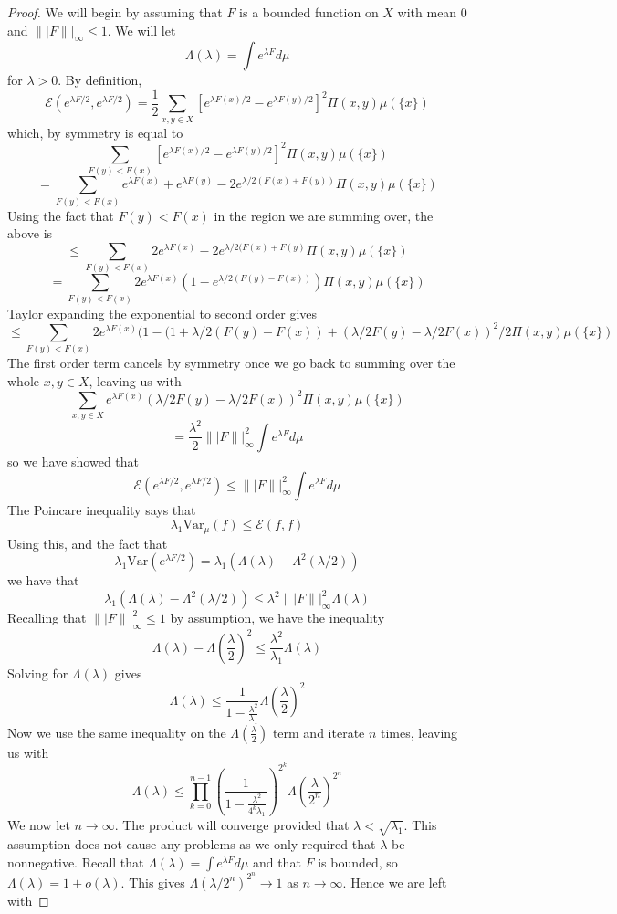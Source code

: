 \documentclass[12pt]{report}
\theoremstyle{definition}
\begin{document}
\begin{proof}
We will begin by assuming that $F$ is a bounded function on $X$ with mean $0$ and $\||F\||_{\infty}\leq 1$.  We will let 
$$
\Lambda(\lambda)=\int e^{\lambda F}d\mu
$$
for $\lambda>0$.  By definition, 
$$
\mathcal{E}( e^{\lambda F/2},  e^{\lambda F/2})=\frac{1}{2}\sum_{x,y\in X}[ e^{\lambda F(x)/2}-e^{\lambda F(y)/2}]^2\Pi(x,y)\mu(\{x\})
$$
which, by symmetry is equal to 
$$
\sum_{F(y)<F(x)}[ e^{\lambda F(x)/2}-e^{\lambda F(y)/2}]^2\Pi(x,y)\mu(\{x\})
$$
$$
=\sum_{F(y)<F(x)}e^{\lambda F(x)}+e^{\lambda F(y)}-2e^{\lambda/2(F(x)+F(y))}\Pi(x,y)\mu(\{x\})
$$
Using the fact that $F(y)<F(x)$ in the region we are summing over, the above is 
$$
\leq \sum_{F(y)<F(x)} 2e^{\lambda F(x)}-2e^{\lambda/2(F(x)+F(y)}\Pi(x,y)\mu(\{x\})
$$
$$
=\sum_{F(y)<F(x)}2e^{\lambda F(x)}(1-e^{\lambda/2(F(y)-F(x))})\Pi(x,y)\mu(\{x\})
$$
Taylor expanding the exponential to second order gives 
$$
\leq \sum_{F(y)<F(x)} 2e^{\lambda F(x)}(1-(1+\lambda/2(F(y)-F(x))+(\lambda/2 F(y)-\lambda/2F(x))^2/2 \Pi(x,y)\mu(\{x\})
$$
The first order term cancels by symmetry once we go back to summing over the whole $x,y\in X$, leaving us with 
$$
\sum_{x,y\in X} e^{\lambda F(x)}(\lambda/2 F(y)-\lambda/2F(x))^2\Pi(x,y)\mu(\{x\})
$$
$$
=\frac{\lambda^2}{2} \||F\||_{\infty}^2 \int e^{\lambda F}d\mu
$$
so we have showed that 
$$
\mathcal{E}(e^{\lambda F/2},e^{\lambda F/2})\leq \||F\||_{\infty}^2\int e^{\lambda F}d\mu 
$$
The Poincare inequality says that 
$$
\lambda_1\mathrm{Var}_{\mu}(f)\leq \mathcal{E}(f,f)
$$
Using this, and the fact that $$\lambda_1\mathrm{Var}(e^{\lambda F/2})=\lambda_1(\Lambda(\lambda)-\Lambda^2(\lambda/2))$$
we have that 
$$
\lambda_1(\Lambda(\lambda)-\Lambda^2(\lambda/2))\leq \lambda^2 \||F\||_{\infty}^2\Lambda(\lambda)
$$
Recalling that $\||F\||_{\infty}^2\leq 1$ by assumption, we have the inequality 
$$
\Lambda(\lambda)-\Lambda\left(\frac{\lambda}{2}\right)^2\leq \frac{\lambda^2}{\lambda_1}
\Lambda(\lambda)
$$
Solving for $\Lambda(\lambda)$ gives 
$$
\Lambda(\lambda)\leq \frac{1}{1-\frac{\lambda^2}{\lambda_1}}\Lambda\left(\frac{\lambda}{2}\right)^2
$$
Now we use the same inequality on the $\Lambda\left(\frac{\lambda}{2}\right)$ term and iterate $n$ times, leaving us with 
$$
\Lambda(\lambda)\leq \prod_{k=0}^{n-1}\left(\frac{1}{1-\frac{\lambda^2}{4^k\lambda_1}}\right)^{2^k}\Lambda\left(\frac{\lambda}{2^n}\right)^{2^n}
$$
We now let $n\rightarrow\infty$.  The product will converge provided that $\lambda<\sqrt{\lambda_1}$.  This assumption does not cause any problems as we only required that $\lambda$ be nonnegative.  Recall that $\Lambda(\lambda)=\int e^{\lambda F} d\mu$ and that $F$ is bounded, so $\Lambda(\lambda)=1+o(\lambda)$.  This gives $\Lambda(\lambda/2^n)^{2^n}\rightarrow 1$ as $n\rightarrow\infty$.  Hence we are left with 

\end{proof}
\end{document}
